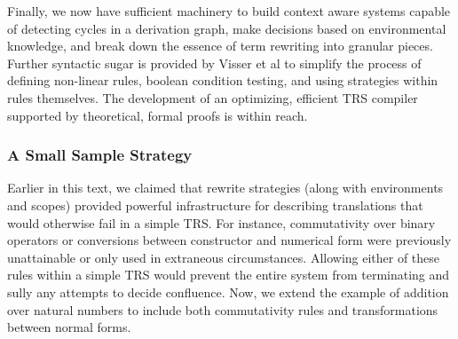 \documentclass{article}
\begin{document}
Finally, we now have sufficient machinery to build context aware systems capable of detecting cycles in a derivation graph, make decisions based on environmental knowledge,
and break down the essence of term rewriting into granular pieces. Further syntactic sugar is provided by Visser et al \cite{elco1998building}
to simplify the process of defining non-linear rules, boolean condition testing, and using strategies within rules themselves.
The development of an optimizing, efficient TRS compiler supported by theoretical, formal proofs is within reach.

\subsubsection{A Small Sample Strategy}
Earlier in this text, we claimed that rewrite strategies (along with environments and scopes) provided
powerful infrastructure for describing translations that would otherwise fail in a simple TRS.
For instance, commutativity over binary operators or conversions between constructor and numerical form
were previously unattainable or only used in extraneous circumstances.
Allowing either of these rules within a simple TRS would prevent the entire system from terminating and sully any attempts to decide confluence.
Now, we extend the example of addition over natural numbers to include both commutativity rules and transformations between normal forms.
\end{document}
